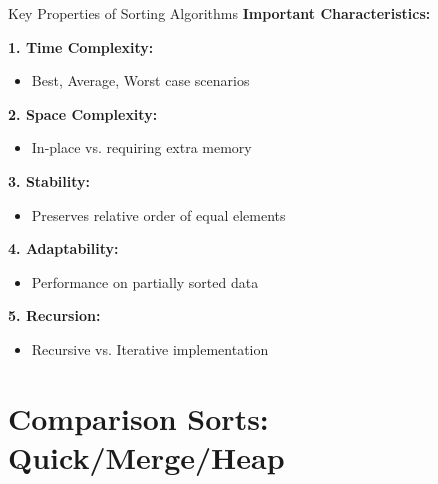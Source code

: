 \documentclass[aspectratio=169]{beamer}
\begin{document}
\begin{frame}{Key Properties of Sorting Algorithms}
  \textbf{Important Characteristics:}

  \vspace{0.3cm}
  \textbf{1. Time Complexity:}
  \begin{itemize}
    \item Best, Average, Worst case scenarios
  \end{itemize}

  \vspace{0.2cm}
  \textbf{2. Space Complexity:}
  \begin{itemize}
    \item In-place vs. requiring extra memory
  \end{itemize}

  \vspace{0.2cm}
  \textbf{3. Stability:}
  \begin{itemize}
    \item Preserves relative order of equal elements
  \end{itemize}

  \vspace{0.2cm}
  \textbf{4. Adaptability:}
  \begin{itemize}
    \item Performance on partially sorted data
  \end{itemize}

  \vspace{0.2cm}
  \textbf{5. Recursion:}
  \begin{itemize}
    \item Recursive vs. Iterative implementation
  \end{itemize}
\end{frame}

\section{Comparison Sorts: Quick/Merge/Heap}
\end{document}

